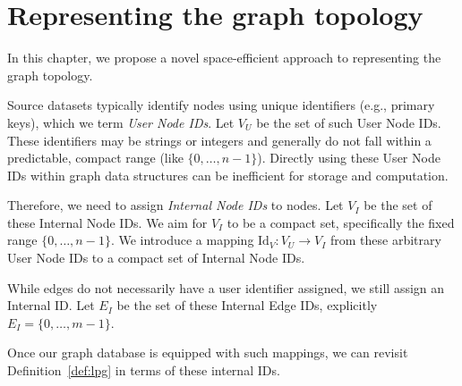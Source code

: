 \chapter{Representing the graph topology}

In this chapter, we propose a novel space-efficient approach to representing the graph topology.

Source datasets typically identify nodes using unique identifiers (e.g., primary keys), which we term \emph{User Node IDs}. Let $V_U$ be the set of such User Node IDs. These identifiers may be strings or integers and generally do not fall within a predictable, compact range (like $\{0, \dots,  n-1\}$). Directly using these User Node IDs within graph data structures can be inefficient for storage and computation.

Therefore, we need to assign \emph{Internal Node IDs} to nodes. Let $V_I$ be the set of these Internal Node IDs. We aim for $V_I$ to be a compact set, specifically the fixed range $\{0,\dots , n - 1 \}$. We introduce a mapping $\mathrm{Id}_V: V_U \to V_I$ from these arbitrary User Node IDs to a compact set of Internal Node IDs.

While edges do not necessarily have a user identifier assigned, we still assign an Internal ID. Let $E_I$ be the set of these Internal Edge IDs, explicitly $E_I = \{0, \dots, m - 1\}$.


Once our graph database is equipped with such mappings, we can revisit Definition~\ref{def:lpg} in terms of these internal IDs.

